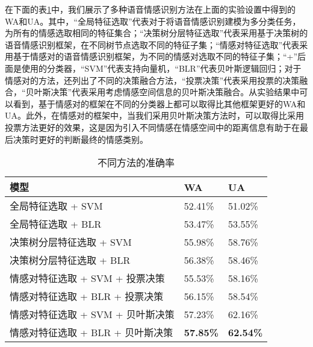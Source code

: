 在下面的表\ref{tab:acc_emo_pair}中，我们展示了多种语音情感识别方法在上面的实验设置中得到的WA和UA。其中，“全局特征选取”代表对于将语音情感识别建模为多分类任务，为所有的情感选取相同的特征集合；“决策树分层特征选取”代表采用基于决策树的语音情感识别框架，在不同树节点选取不同的特征子集；“情感对特征选取”代表采用基于情感对的语音情感识别框架，为不同的情感对选取不同的特征子集；“+”后面是使用的分类器，“SVM”代表支持向量机，“BLR”代表贝叶斯逻辑回归；对于情感对的方法，还列出了不同的决策融合方法，“投票决策”代表采用投票的决策融合，“贝叶斯决策”代表采用考虑情感空间信息的贝叶斯决策融合。从实验结果中可以看到，基于情感对的框架在不同的分类器上都可以取得比其他框架更好的WA和UA。此外，在情感对的框架中，当我们采用贝叶斯决策方法时，可以取得比采用投票方法更好的效果，这是因为引入不同情感在情感空间中的距离信息有助于在最后决策时更好的判断最终的情感类别。

\begin{table}[htb]
\centering
\begin{minipage}[t]{0.8\linewidth} %
\caption{不同方法的准确率}
\label{tab:acc_emo_pair}
    \begin{tabularx}{\linewidth}{X<{\centering} X<{\centering} X<{\centering}}
        \toprule[1.5pt]
        模型 & WA & UA \\
        \midrule[1pt]
        全局特征选取 + SVM & 52.41\% & 51.02\% \\
        全局特征选取 + BLR & 53.47\% & 53.55\% \\
        决策树分层特征选取 + SVM & 55.98\% & 58.76\% \\
        决策树分层特征选取 + BLR & 56.38\% & 58.46\% \\
        情感对特征选取 + SVM + 投票决策 & 55.53\% & 58.16\% \\
        情感对特征选取 + BLR + 投票决策 & 56.15\% & 58.54\% \\
        情感对特征选取 + SVM + 贝叶斯决策 & 57.23\% & 62.16\% \\
        情感对特征选取 + BLR + 贝叶斯决策 & \textbf{57.85\%} & \textbf{62.54\%} \\
        \bottomrule[1.5pt]
    \end{tabularx}
\end{minipage}
\end{table}

